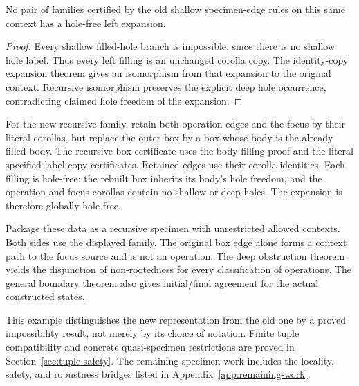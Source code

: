 \begin{lemma}
No pair of families certified by the old shallow specimen-edge rules
on this same context has a hole-free left expansion.
\end{lemma}
\begin{proof}
Every shallow filled-hole branch is impossible, since there is no
shallow hole label. Thus every left filling is an unchanged corolla
copy. The identity-copy expansion theorem gives an isomorphism from
that expansion to the original context. Recursive isomorphism
preserves the explicit deep hole occurrence, contradicting claimed
hole freedom of the expansion.
\end{proof}

For the new recursive family, retain both operation edges and the
focus by their literal corollas, but replace the outer box by a box
whose body is the already filled body. The recursive box certificate
uses the body-filling proof and the literal specified-label copy
certificates. Retained edges use their corolla identities. Each filling
is hole-free: the rebuilt box inherits its body's hole freedom, and
the operation and focus corollas contain no shallow or deep holes.
The expansion is therefore globally hole-free.

Package these data as a recursive specimen with unrestricted allowed
contexts. Both sides use the displayed family. The original box edge
alone forms a context path to the focus source and is not an operation.
The deep obstruction theorem yields the disjunction of non-rootedness
for every classification of operations. The general boundary theorem
also gives initial/final agreement for the actual constructed states.

This example distinguishes the new representation from the old one by
a proved impossibility result, not merely by its choice of notation.
Finite tuple compatibility and concrete quasi-specimen restrictions are proved
in Section~\ref{sec:tuple-safety}. The remaining specimen work includes the
locality, safety, and robustness bridges listed in
Appendix~\ref{app:remaining-work}.
